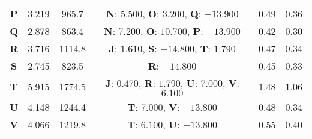 \begin{longtable}[h!]{c c c c c c}
\textbf{P} & 3.219 & 965.7 & \textbf{N}: $5.500$, \textbf{O}: $3.200$, \textbf{Q}: $-13.900$& 0.49& 0.36 \\
\textbf{Q} & 2.878 & 863.4 & \textbf{N}: $7.200$, \textbf{O}: $10.700$, \textbf{P}: $-13.900$& 0.42& 0.30 \\
\textbf{R} & 3.716 & 1114.8 & \textbf{J}: $1.610$, \textbf{S}: $-14.800$, \textbf{T}: $1.790$& 0.47& 0.34 \\
\textbf{S} & 2.745 & 823.5 & \textbf{R}: $-14.800$& 0.45& 0.33 \\
\textbf{T} & 5.915 & 1774.5 & \textbf{J}: $0.470$, \textbf{R}: $1.790$, \textbf{U}: $7.000$, \textbf{V}: $6.100$& 1.48& 1.06 \\
\textbf{U} & 4.148 & 1244.4 & \textbf{T}: $7.000$, \textbf{V}: $-13.800$& 0.48& 0.34 \\
\textbf{V} & 4.066 & 1219.8 & \textbf{T}: $6.100$, \textbf{U}: $-13.800$& 0.55& 0.40 \\

\hline
\end{longtable}
